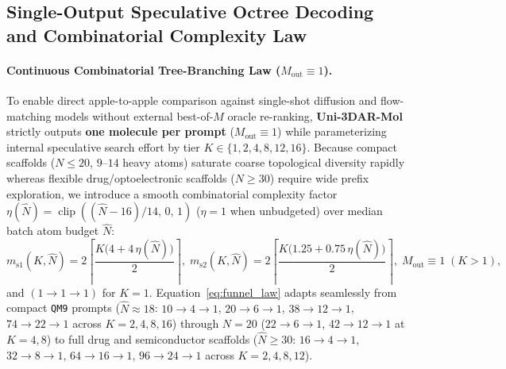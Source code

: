 \documentclass[11pt,a4paper]{article}
\begin{document}
\subsection{Single-Output Speculative Octree Decoding and Combinatorial Complexity Law}
\label{sec:spectree}

\paragraph{Continuous Combinatorial Tree-Branching Law ($M_{\text{out}} \equiv 1$).}
To enable direct apple-to-apple comparison against single-shot diffusion and flow-matching models without external best-of-$M$ oracle re-ranking, \textbf{Uni-3DAR-Mol} strictly outputs \textbf{one molecule per prompt} ($M_{\text{out}} \equiv 1$) while parameterizing internal speculative search effort by tier $K \in \{1, 2, 4, 8, 12, 16\}$. Because compact scaffolds ($N \le 20$, $9\text{--}14$ heavy atoms) saturate coarse topological diversity rapidly whereas flexible drug/optoelectronic scaffolds ($N \ge 30$) require wide prefix exploration, we introduce a smooth combinatorial complexity factor $\eta(\hat{N}) = \operatorname{clip}((\hat{N} - 16)/14,\, 0,\, 1)$ ($\eta = 1$ when unbudgeted) over median batch atom budget $\hat{N}$:
\begin{equation}
\label{eq:funnel_law}
m_{\text{s1}}(K, \hat{N}) = 2 \left\lceil \frac{K \big(4 + 4\,\eta(\hat{N})\big)}{2} \right\rceil, \;
m_{\text{s2}}(K, \hat{N}) = 2 \left\lceil \frac{K \big(1.25 + 0.75\,\eta(\hat{N})\big)}{2} \right\rceil, \;
M_{\text{out}} \equiv 1 \; (K > 1),
\end{equation}
and $(1 \to 1 \to 1)$ for $K=1$. Equation~\eqref{eq:funnel_law} adapts seamlessly from compact \texttt{QM9} prompts ($\hat{N} \approx 18$: $10\to 4\to 1$, $20\to 6\to 1$, $38\to 12\to 1$, $74\to 22\to 1$ across $K=2,4,8,16$) through $N=20$ ($22\to 6\to 1$, $42\to 12\to 1$ at $K=4,8$) to full drug and semiconductor scaffolds ($\hat{N} \ge 30$: $16\to 4\to 1$, $32\to 8\to 1$, $64\to 16\to 1$, $96\to 24\to 1$ across $K=2,4,8,12$).
\end{document}
